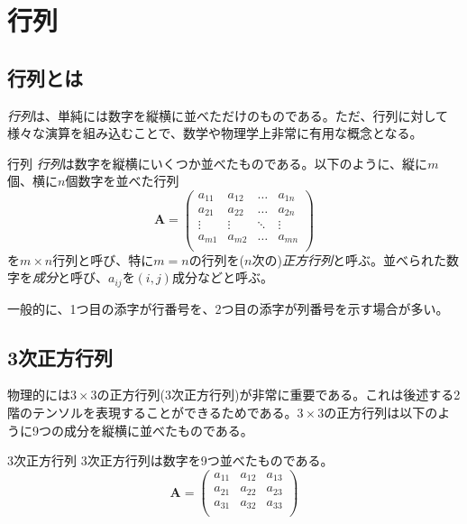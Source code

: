 \chapter{行列}
\section{行列とは}
\emph{行列}は、単純には数字を縦横に並べただけのものである。ただ、行列に対して様々な演算を組み込むことで、数学や物理学上非常に有用な概念となる。
\begin{definition*}{行列}
	\emph{行列}は数字を縦横にいくつか並べたものである。以下のように、縦に\(m\)個、横に\(n\)個数字を並べた行列
	\begin{equation}
		\boldsymbol{A}=
		\begin{pmatrix}
			a_{11} & a_{12} & \dots  & a_{1n} \\
			a_{21} & a_{22} & \dots  & a_{2n} \\
			\vdots & \vdots & \ddots & \vdots \\
			a_{m1} & a_{m2} & \dots  & a_{mn} \\
		\end{pmatrix}
	\end{equation}
	を\(m\times n\)行列と呼び、特に\(m=n\)の行列を(\(n\)次の)\emph{正方行列}と呼ぶ。並べられた数字を\emph{成分}と呼び、\(a_{ij}\)を\((i,j)\)成分などと呼ぶ。
\end{definition*}
一般的に、1つ目の添字が行番号を、2つ目の添字が列番号を示す場合が多い。
\section{3次正方行列}
物理的には\(3\times 3\)の正方行列(3次正方行列)が非常に重要である。これは後述する2階のテンソルを表現することができるためである。\(3\times 3\)の正方行列は以下のように9つの成分を縦横に並べたものである。
\begin{definition*}{3次正方行列}
	3次正方行列は数字を9つ並べたものである。
	\begin{equation}
		\boldsymbol{A}=
		\begin{pmatrix}
			a_{11} & a_{12} & a_{13} \\
			a_{21} & a_{22} & a_{23} \\
			a_{31} & a_{32} & a_{33} \\
		\end{pmatrix}
	\end{equation}
\end{definition*}

